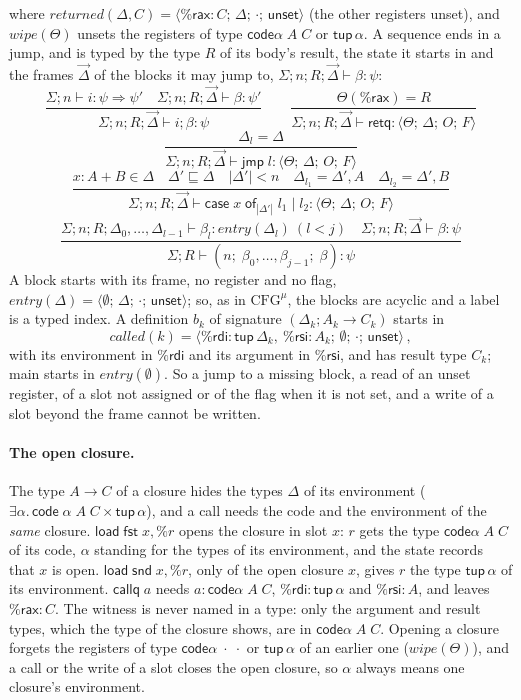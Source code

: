 \documentclass[10pt]{article}
\theoremstyle{acmplain}
\newcommand{\key}[1]{\mathsf{#1}}
\newcommand{\rax}{\%\key{rax}}
\newcommand{\rdi}{\%\key{rdi}}
\newcommand{\rsi}{\%\key{rsi}}
\newcommand{\Tst}[4]{\langle #1;\, #2;\, #3;\, #4 \rangle} %
\newcommand{\tupA}{\key{tup}\,\alpha}                     %
\newcommand{\Tentry}[1]{\mathit{entry}(#1)}
\newcommand{\Tcalled}[1]{\mathit{called}(#1)}
\newcommand{\Treturned}[1]{\mathit{returned}(#1)}
\newcommand{\Twipe}[1]{\mathit{wipe}(#1)}
\newcommand{\Tunset}{\key{unset}}
\newcommand{\Ml}[1]{\textrm{#1}^{\mu}}                  %
\newcommand{\Mtup}[1]{\key{tup}\,#1}                      %
\newcommand{\Mcodety}[3]{\key{code}\;#1\;#2\;#3}          %
\newcommand{\codeAB}[2]{\key{code}\alpha\;#1\;#2}         %
\newcommand{\Mxcase}[4]{\key{case}\;#1\;\key{of}_{#2}\;#3 \mid #4}  %
\begin{document}
where $\Treturned{\Delta, C} = \Tst{\rax{:}C}{\Delta}{\cdot}{\Tunset}$
(the other registers unset), and $\Twipe{\Theta}$ unsets the registers of
type $\codeAB{A}{C}$ or $\tupA$. A sequence ends in a jump, and is typed by
the type $R$ of its body's result, the state it starts in and the frames
$\vec{\Delta}$ of the blocks it may jump to,
$\Sigma; n; R; \vec{\Delta} \vdash \beta : \psi$:
\[
  \frac{\Sigma; n \vdash i : \psi \Rightarrow \psi' \quad \Sigma; n; R; \vec{\Delta} \vdash \beta : \psi'}
       {\Sigma; n; R; \vec{\Delta} \vdash i; \beta : \psi}
  \qquad
  \frac{\Theta(\rax) = R}{\Sigma; n; R; \vec{\Delta} \vdash \key{retq} : \Tst{\Theta}{\Delta}{O}{F}}
\]
\[
  \frac{\Delta_l = \Delta}{\Sigma; n; R; \vec{\Delta} \vdash \key{jmp}\; l : \Tst{\Theta}{\Delta}{O}{F}}
\]
\[
  \frac{x : A + B \in \Delta \quad \Delta' \sqsubseteq \Delta \quad |\Delta'| < n \quad
        \Delta_{l_1} = \Delta', A \quad \Delta_{l_2} = \Delta', B}
       {\Sigma; n; R; \vec{\Delta} \vdash \Mxcase{x}{|\Delta'|}{l_1}{l_2} : \Tst{\Theta}{\Delta}{O}{F}}
\]
\[
  \frac{\Sigma; n; R; \Delta_0, \ldots, \Delta_{l-1} \vdash \beta_l : \Tentry{\Delta_l}\ (l < j) \quad
        \Sigma; n; R; \vec{\Delta} \vdash \beta : \psi}
       {\Sigma; R \vdash (n;\; \beta_0, \ldots, \beta_{j-1};\; \beta) : \psi}
\]
A block starts with its frame, no register and no flag,
$\Tentry{\Delta} = \Tst{\emptyset}{\Delta}{\cdot}{\Tunset}$; so, as in
$\Ml{CFG}$, the blocks are acyclic and a label is a typed index. A
definition $b_k$ of signature $(\Delta_k; A_k \to C_k)$ starts in
\[ \Tcalled{k} = \Tst{\rdi{:}\Mtup{\Delta_k},\ \rsi{:}A_k}{\emptyset}{\cdot}{\Tunset}\,, \]
with its environment in $\rdi$ and its argument in $\rsi$, and has result
type $C_k$; main starts in $\Tentry{\emptyset}$. So a jump to a missing
block, a read of an unset register, of a slot not assigned or of the flag
when it is not set, and a write of a slot beyond the frame cannot be
written.

\paragraph{The open closure.} The type $A \rightarrow C$ of a closure
hides the types $\Delta$ of its environment ($\exists \alpha.\,
\Mcodety{\alpha}{A}{C} \times \Mtup{\alpha}$), and a call needs the code
and the environment of the \emph{same} closure. $\key{load}\;\key{fst}\;
x, \%r$ opens the closure in slot $x$: $r$ gets the type $\codeAB{A}{C}$ of
its code, $\alpha$ standing for the types of its environment, and the
state records that $x$ is open. $\key{load}\; \key{snd}\; x, \%r$, only of
the open closure $x$, gives $r$ the type $\tupA$ of its environment.
$\key{callq}\; a$ needs $a : \codeAB{A}{C}$, $\rdi : \tupA$ and $\rsi : A$,
and leaves $\rax : C$. The witness is never named in a type: only the
argument and result types, which the type of the closure shows, are in
$\codeAB{A}{C}$. Opening a closure forgets the registers of type
$\codeAB{\cdot}{\cdot}$ or $\tupA$ of an earlier one ($\Twipe{\Theta}$),
and a call or the write of a slot closes the open closure, so $\alpha$
always means one closure's environment.
\end{document}
